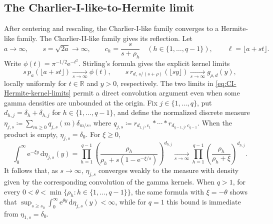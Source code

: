 \documentclass[10pt]{amsart}
\newcommand{\R}{\mathbb R}
\newcommand{\e}{\mathrm e}
\newcommand{\dd}{\,\mathrm d}
\theoremstyle{plain}
\theoremstyle{definition}
\theoremstyle{remark}
\begin{document}
\subsection{The Charlier-I-like-to-Hermite limit}

After centering and rescaling, the Charlier-I-like family converges to a
Hermite-like family. The Charlier-II-like family gives its reflection.
Let
\begin{equation}
 a\to\infty,\qquad s=\sqrt{2a}\to\infty,\qquad
 c_h=\frac{s}{s+\rho_h}\quad
 (h\in\{1,\ldots,q-1\}),\qquad
 \ell=\lfloor a+st\rfloor.
 \label{eq:Hermite-scaling}
\end{equation}
Write \(\phi(t)=\pi^{-1/2}\e^{-t^2}\). Stirling's formula gives the
explicit kernel limits
\begin{equation}
 s\,p_a(\lfloor a+st\rfloor)\xrightarrow[s\to\infty]{}\phi(t),
 \qquad
 s\,r_{d,\,s/(s+\rho)}(\lfloor sy\rfloor)
 \xrightarrow[s\to\infty]{}g_{\rho,d}(y),
 \label{eq:CI-Hermite-kernel-limits}
\end{equation}
locally uniformly for \(t\in\R\) and \(y>0\), respectively. The two limits
in \eqref{eq:CI-Hermite-kernel-limits} permit a direct convolution argument
even when some gamma densities
are unbounded at the origin. Fix \(j\in\{1,\ldots,q\}\), put
\(d_{h,j}=\delta_h+\delta_{h,j}\) for
\(h\in\{1,\ldots,q-1\}\), and define the normalized discrete measure
\(\eta_{j,s}\coloneq\sum_{m\ge0}q_{j,s}(m)\delta_{m/s}\), where
\(q_{j,s}\coloneq r_{d_{1,j},c_1}*\cdots*r_{d_{q-1,j},c_{q-1}}\).
When the product is empty, \(\eta_{j,s}=\delta_0\). For \(\xi\ge0\),
\[
 \int_0^\infty\e^{-\xi y}\dd\eta_{j,s}(y)
 =\prod_{h=1}^{q-1}
 \left(\frac{\rho_h}
 {\rho_h+s(1-\e^{-\xi/s})}\right)^{d_{h,j}}
 \xrightarrow[s\to\infty]{}
 \prod_{h=1}^{q-1}
 \left(\frac{\rho_h}{\rho_h+\xi}\right)^{d_{h,j}}.
\]
It follows that, as \(s\to\infty\), \(\eta_{j,s}\) converges weakly to the measure with density
given by the corresponding convolution of the gamma kernels. When \(q>1\),
for every
\(0<\theta<\min\{\rho_h:h\in\{1,\ldots,q-1\}\}\), the same formula with
\(\xi=-\theta\) shows that
\(\sup_{s\ge s_0}\int_0^\infty\e^{\theta y}\dd\eta_{j,s}(y)<\infty\),
while for \(q=1\) this bound is immediate from \(\eta_{1,s}=\delta_0\).
\end{document}
